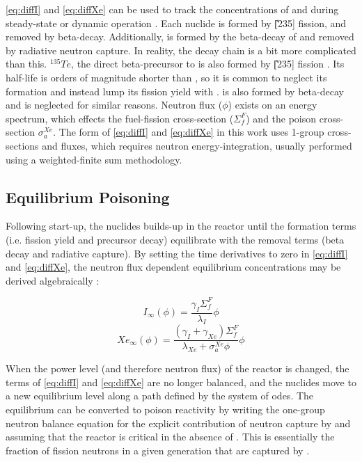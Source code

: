 \ref{eq:diffI} and \ref{eq:diffXe} can be used to track the concentrations of \I and \Xe during steady-state or dynamic operation \cite[Ch. 7]{Lamarsh}. Each nuclide is formed by \U[235] fission, and removed by beta-decay. Additionally, \Xe is formed by the beta-decay of \I and removed by radiative neutron capture. In reality, the decay chain is a bit more complicated than this. $^{135}Te$, the direct beta-precursor to \I is also formed by \U[235] fission \cite{Roberson}. Its half-life is orders of magnitude shorter than \I, so it is common to neglect its formation and instead lump its fission yield with \I. \Xe[135m] is also formed by \I beta-decay and is neglected for similar reasons. Neutron flux ($\phi$) exists on an energy spectrum, which effects the fuel-fission cross-section ($\Sigma_{f}^{F}$) and the \Xe poison cross-section $\sigma_{a}^{Xe}$. The form of \ref{eq:diffI} and \ref{eq:diffXe} in this work uses 1-group cross-sections and fluxes, which requires
 neutron energy-integration, usually performed using a weighted-finite sum methodology. 

\subsection{Equilibrium Poisoning}
Following start-up, the nuclides builds-up in the reactor until the formation terms (i.e. fission yield and precursor decay) equilibrate with the removal terms (beta decay and radiative capture). By setting the time derivatives to zero in \ref{eq:diffI} and \ref{eq:diffXe}, the neutron flux dependent equilibrium concentrations may be derived algebraically \cite[Ch. 7]{Lamarsh}:

\begin{equation}\label{eq:I_eq}
    I_{\infty}(\phi) = \frac{\gamma_I \Sigma_f^F }{\lambda_I}\phi
\end{equation}
\begin{equation}\label{eq:Xe_eq}
    Xe_{\infty}(\phi) = \frac{(\gamma_I+\gamma_{Xe}) \Sigma_f^F }{\lambda_{Xe}+\sigma_a^{Xe}\phi}\phi
\end{equation}

When the power level (and therefore neutron flux) of the reactor is changed, the terms of \ref{eq:diffI} and \ref{eq:diffXe} are no longer balanced, and the nuclides move to a new equilibrium level along a path defined by the system of \acsp{ode}. The equilibrium \Xe can be converted to poison reactivity  by writing the one-group neutron balance equation for the explicit contribution of neutron capture by \Xe and assuming that the reactor is critical in the absence of \Xe. This is essentially the fraction of fission neutrons in a given generation that are captured by \Xe \cite{Bateman}.

